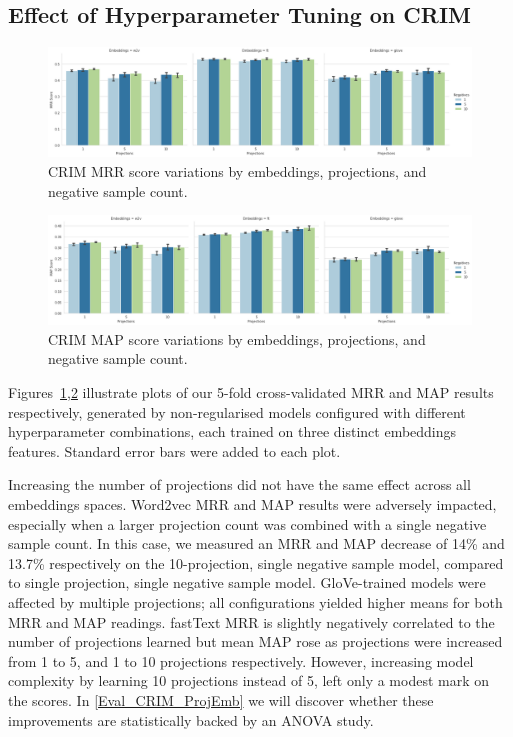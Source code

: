\subsection{Effect of Hyperparameter Tuning on CRIM} \label{hyper_effect_CRIM}
\begin{figure}[ht!] 
  \centering
  \includegraphics[width=1.\linewidth]{images/CRIM_MRR_score_projection_and_negative_sample.png}
  \caption{CRIM \ac{MRR} score variations by embeddings, projections, and negative sample count.}
  \label{fig:crim_hyper_mrr}
\end{figure}
\begin{figure}[ht!] 
  \centering
  \includegraphics[width=1.\linewidth]{images/CRIM_MAP_score_projection_and_negative_sample.png}
  \caption{CRIM \ac{MAP} score variations by embeddings, projections, and negative sample count.}
  \label{fig:crim_hyper_map}
\end{figure}
Figures~\ref{fig:crim_hyper_mrr},\ref{fig:crim_hyper_map} illustrate plots of our 5-fold cross-validated \ac{MRR} and \ac{MAP} results respectively, generated by non-regularised models configured with different hyperparameter combinations, each trained on three distinct embeddings features.  Standard error bars were added to each plot.  

Increasing the number of projections did not have the same effect across all embeddings spaces.  Word2vec \ac{MRR} and \ac{MAP} results were adversely impacted, especially when a larger projection count was combined with a single negative sample count.  In this case, we measured an MRR and MAP decrease of 14\% and 13.7\% respectively on the 10-projection, single negative sample model, compared to single projection, single negative sample model.  GloVe-trained models were affected by multiple projections; all configurations yielded higher means for both \ac{MRR} and \ac{MAP} readings.  fastText \ac{MRR} is slightly negatively correlated to the number of projections learned but mean \ac{MAP} rose as projections were increased from 1 to 5, and 1 to 10 projections respectively.  However, increasing model complexity by learning 10 projections instead of 5, left only a modest mark on the scores.  In \cref{Eval_CRIM_ProjEmb} we will discover whether these improvements are statistically backed by an \ac{ANOVA} study.


